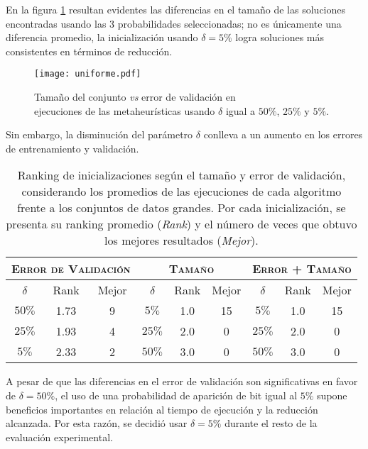 En la figura \ref{fig-unif} resultan evidentes las diferencias en el tamaño de las soluciones encontradas usando las 3 probabilidades seleccionadas; no es únicamente una diferencia promedio, la inicialización usando $\delta = 5\%$ logra soluciones más consistentes en términos de reducción.

\begin{figure}[h!]
\centering
\texttt{[image: uniforme.pdf]}
\caption[Tamaño \emph{vs} error de validación modificando $\delta$]{Tamaño del conjunto \emph{vs} error de validación en\\ejecuciones de las metaheurísticas usando $\delta$ igual a $50\%$, $25\%$ y $5\%$.}
\label{fig-unif}
\end{figure}

Sin embargo, la disminución del parámetro $\delta$ conlleva a un aumento en los errores de entrenamiento y validación. 

\begin{table}[h!]
\centering
\begin{tabular}{c c c|c c c|c c c}
\hline
\multicolumn{3}{c|}{\textsc{Error de Validación}}
	& \multicolumn{3}{c|}{\textsc{Tamaño}}
	& \multicolumn{3}{c}{\textsc{Error + Tamaño}} \\
\hline
$\delta$ & Rank & Mejor & $\delta$ & Rank & Mejor & $\delta$ & Rank & Mejor \\
\hline
\hline
$50\%$ & 1.73 & 9 & $5\%$  & 1.0 & 15 & $5\%$  & 1.0 & 15 \\
$25\%$ & 1.93 & 4 & $25\%$ & 2.0 &  0 & $25\%$ & 2.0 &  0 \\
$5\%$  & 2.33 & 2 & $50\%$ & 3.0 &  0 & $50\%$ & 3.0 &  0 \\
\hline
\end{tabular}
\caption[Ranking de probabilidad de bit $\delta$ según el tamaño y error de validación]{Ranking de inicializaciones según el tamaño y error de validación, considerando los promedios de las ejecuciones de cada algoritmo frente a los conjuntos de datos grandes. Por cada inicialización, se presenta su ranking promedio (\emph{Rank}) y el número de veces que obtuvo los mejores resultados (\emph{Mejor}).}
\label{table-unif-rank}
\end{table}

A pesar de que las diferencias en el error de validación son significativas en favor de $\delta = 50\%$, el uso de una probabilidad de aparición de bit igual al $5\%$ supone beneficios importantes en relación al tiempo de ejecución y la reducción alcanzada. Por esta razón, se decidió usar $\delta = 5\%$ durante el resto de la evaluación experimental.

